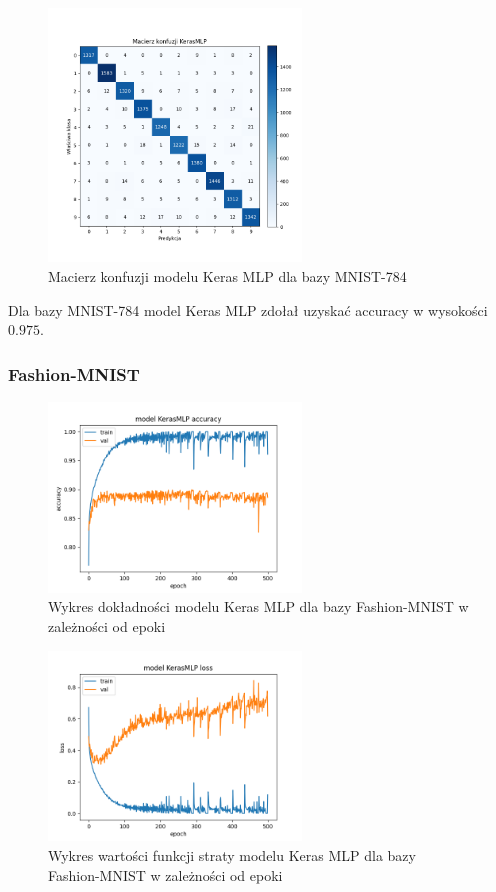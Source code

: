 \documentclass{article}
\begin{document}
\begin{figure}[H]
	\centering
	\includegraphics[width=0.6\textwidth]{../Saves/KerasMLP/mnist-784/KerasMLP_mnist_784_conf_mat.png}
	\caption{Macierz konfuzji modelu Keras MLP dla bazy MNIST-784}
\end{figure}
Dla bazy MNIST-784 model Keras MLP zdołał uzyskać accuracy w wysokości $0.975$.

\subsubsection{Fashion-MNIST}
\begin{figure}[H]
    \centering
    \includegraphics[width=0.6\textwidth]{../Saves/KerasMLP/fashion-mnist/KerasMLP_fashion-mnist_ep500_acc.png}
    \caption{Wykres dokładności modelu Keras MLP dla bazy Fashion-MNIST w zależności od epoki}
\end{figure}

\begin{figure}[H]
    \centering
    \includegraphics[width=0.6\textwidth]{../Saves/KerasMLP/fashion-mnist/KerasMLP_fashion-mnist_ep500_loss.png}
    \caption{Wykres wartości funkcji straty modelu Keras MLP dla bazy Fashion-MNIST w zależności od epoki}
\end{figure}
\end{document}
